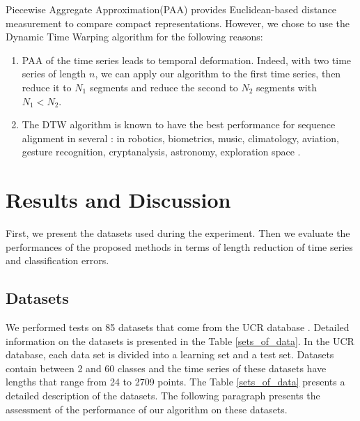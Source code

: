 Piecewise Aggregate Approximation(PAA) provides Euclidean-based distance measurement to compare compact representations. However, we chose to use the Dynamic Time Warping algorithm for the following reasons:
\begin{enumerate}
\item PAA of the time series leads to temporal deformation. Indeed,
with two time series of length $ n $, we can apply our algorithm to the
 first time series, then reduce it to $ N_{1} $ segments and reduce the second to $ N_{2} $
 segments with $ N_{1} <N_{2} $.
\item The DTW algorithm  is known to have the best performance for sequence alignment in several :
in robotics, biometrics, music, climatology, aviation, gesture recognition, cryptanalysis, astronomy, exploration
space \cite{Rakthanmanon2012}.

\end{enumerate}


\section{Results and Discussion}
\label{results} 
 First, we present the datasets used during the experiment.
 Then we evaluate the performances of the proposed methods in terms of  length reduction  of time series and classification errors.

\subsection{Datasets}

We performed tests on 85 datasets that come from the UCR database
\cite{UCRArchive} . Detailed information on the datasets is presented in
the Table \ref{sets_of_data}.
 In the UCR database, each data set is divided into a learning set and a test set. Datasets contain between 2 and 60 classes and the time series of these datasets have lengths that range from 24 to 2709 points. The Table \ref{sets_of_data} presents a
 detailed description of the datasets. The following paragraph presents the assessment of the performance of our algorithm on these datasets.
 
